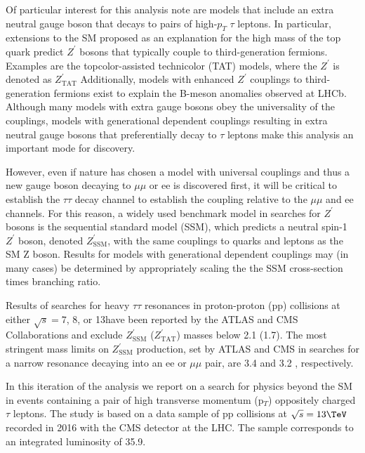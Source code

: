 Of particular interest for this analysis note are models that include an extra neutral gauge boson that decays to pairs of high-$p_{T}$ $\tau$ leptons. 
In particular, extensions to the SM proposed as an explanation for the high mass of the top quark predict $Z^\prime$ bosons that typically couple to
third-generation fermions. 
Examples are the topcolor-assisted technicolor (TAT) models, where the $Z^\prime$ is denoted as $Z^{\prime}_{\textrm{TAT}}$ 
Additionally, models with enhanced $Z^\prime$ couplings to third-generation fermions exist to explain the B-meson anomalies observed at LHCb. 
Although many models with extra gauge bosons obey the universality of the couplings, models with generational dependent couplings resulting in extra neutral gauge 
bosons that preferentially decay to $\tau$ leptons make this analysis an important mode for discovery. 

However, even if nature has chosen a model with universal couplings and thus a new gauge boson decaying to $\mu\mu$ or ee is discovered first, it will be critical to establish the $\tau\tau$ decay 
channel to establish the coupling relative to the $\mu\mu$ and ee channels. For this reason, a widely used benchmark model in searches for $Z^\prime$ bosons is the sequential
standard model (SSM), 
which predicts a neutral spin-1 $Z^\prime$ boson, 
denoted $Z^{\prime}_{\textrm{SSM}}$, with the same couplings to quarks and leptons as the SM Z boson. Results for models with generational dependent couplings may (in many cases) be determined by 
appropriately 
scaling the the SSM cross-section times branching ratio. 

Results of searches for heavy $\tau\tau$ resonances in proton-proton (pp) collisions at either $\sqrt{s}=7$, 8, or 13\TeV have been reported by the ATLAS and CMS Collaborations and exclude 
$Z^{\prime}_{\textrm{SSM}}$ ($Z^{\prime}_{\textrm{TAT}}$) masses below 2.1 (1.7)\TeV. 
The most
stringent mass limits on $Z^{\prime}_{\textrm{SSM}}$ production, set by ATLAS and CMS
in searches for a narrow resonance decaying into an 
ee or $\mu\mu$ pair, are 3.4 
and 3.2
\TeV, respectively.

In this iteration of the analysis we report on a search for physics beyond the SM in
events containing a pair of high transverse momentum (p$_{T}$) oppositely
charged $\tau$ leptons. 
The study is based on a data sample of
pp collisions at $\sqrt{s} = 13\TeV$ recorded in 2016 with the CMS detector at the LHC.
The sample corresponds to an integrated luminosity of 35.9\fbinv.

